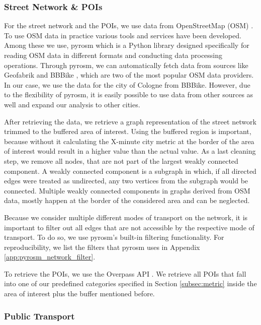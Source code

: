 \subsubsection{Street Network \& POIs}
\label{subs:street_network_pois}

For the street network and the POIs, we use data from OpenStreetMap (OSM) .
To use OSM data in practice various tools and services have been developed.
Among these we use, pyrosm  which is a Python library designed specifically for reading OSM data in different formats and conducting data processing operations.
Through pyrosm, we can automatically fetch data from sources like Geofabrik  and BBBike \cite{BBBikeExtractsOpenStreetMap}, which are two of the most popular OSM data providers.
In our case, we use the data for the city of Cologne from BBBike.
However, due to the flexibility of pyrosm, it is easily possible to use data from other sources as well and expand our analysis to other cities.

After retrieving the data, we retrieve a graph representation of the street network trimmed to the buffered area of interest.
Using the buffered region is important, because without it calculating the X-minute city metric at the border of the area of interest would result in a higher value than the actual value.
As a last cleaning step, we remove all nodes, that are not part of the largest weakly connected component.
A weakly connected component is a subgraph in which, if all directed edges were treated as undirected, any two vertices from the subgraph would be connected.
Multiple weakly connected components in graphs derived from OSM data, mostly happen at the border of the considered area and can be neglected.

Because we consider multiple different modes of transport on the network, it is important to filter out all edges that are not accessible by the respective mode of transport.
To do so, we use pyrosm's built-in filtering functionality.
For reproducibility, we list the filters that pyrosm uses in Appendix \ref{app:pyrosm_network_filter}.

To retrieve the POIs, we use the Overpass API .
We retrieve all POIs that fall into one of our predefined categories specified in Section \ref{subsec:metric} inside the area of interest plus the buffer mentioned before.

\subsubsection{Public Transport}
\label{subs:public_transport}

